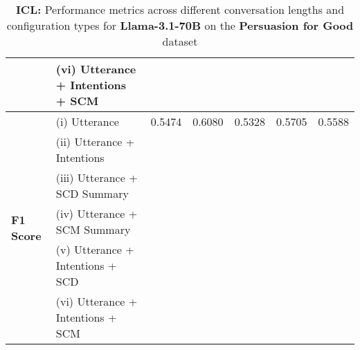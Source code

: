 \begin{table*}[ht]
\begin{tabular}{llccccc}
 & (vi) Utterance + Intentions + SCM & \cellcolor{green!25}{0.5820} & \cellcolor{red!25}{0.5753} & \cellcolor{red!25}{0.5330} & \cellcolor{red!25}{0.5673} & \cellcolor{green!25}{0.6175} \\
\midrule
\multirow{6}{*}{\textbf{F1 Score}} & (i) Utterance & 0.5474 & 0.6080 & 0.5328 & 0.5705 & 0.5588 \\
 & (ii) Utterance + Intentions & \cellcolor{green!25}{0.6064} & \cellcolor{green!25}{0.6160} & \cellcolor{red!25}{0.4861} & \cellcolor{red!25}{0.5287} & \cellcolor{red!25}{0.5236} \\
 & (iii) Utterance + SCD Summary & \cellcolor{green!25}{0.5936} & \cellcolor{red!25}{0.6054} & \cellcolor{red!25}{0.5327} & \cellcolor{red!25}{0.5342} & \cellcolor{red!25}{0.5340} \\
 & (iv) Utterance + SCM Summary & \cellcolor{green!25}{0.5675} & \cellcolor{red!25}{0.5890} & \cellcolor{red!25}{0.5248} & \cellcolor{red!25}{0.5432} & \cellcolor{red!25}{0.5490} \\
 & (v) Utterance + Intentions + SCD & \cellcolor{green!25}{0.6225} & \cellcolor{red!25}{0.5909} & \cellcolor{red!25}{0.5043} & \cellcolor{red!25}{0.5438} & \cellcolor{red!25}{0.5330} \\
 & (vi) Utterance + Intentions + SCM & \cellcolor{green!25}{0.5692} & \cellcolor{red!25}{0.5455} & \cellcolor{red!25}{0.4853} & \cellcolor{red!25}{0.4988} & \cellcolor{red!25}{0.5428} \\
\hline
\end{tabular}
\caption{\textbf{ICL: }Performance metrics across different conversation lengths and configuration types for \textbf{Llama-3.1-70B} on the \textbf{Persuasion for Good} dataset}
\label{tab:combined_metrics_icl_llama_p4g}
\end{table*}